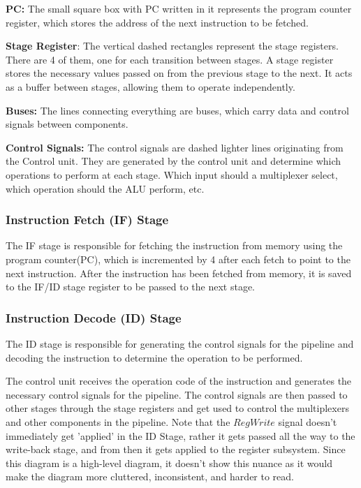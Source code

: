 \textbf{PC:} The small square box with PC written in it represents the program counter register, which stores the address of the next instruction to be fetched. 

\textbf{Stage Register}: The vertical dashed rectangles represent the stage registers. There are 4 of them, one for each transition between stages. A stage register stores the necessary values passed on from the previous stage to the next. It acts as a buffer between stages, allowing them to operate independently.

\textbf{Buses:} The lines connecting everything are buses, which carry data and control signals between components.

\textbf{Control Signals:} The control signals are dashed lighter lines originating from the Control unit. They are generated by the control unit and determine which operations to perform at each stage. Which input should a multiplexer select, which operation should the ALU perform, etc.

\subsubsection{Instruction Fetch (IF) Stage}
The IF stage is responsible for fetching the instruction from memory using the program counter(PC), which is incremented by 4 after each fetch to point to the next instruction. After the instruction has been fetched from memory, it is saved to the IF/ID stage register to be passed to the next stage. 

\subsubsection{Instruction Decode (ID) Stage}
The ID stage is responsible for generating the control signals for the pipeline and decoding the instruction to determine the operation to be performed. 

The control unit receives the operation code of the instruction and generates the necessary control signals for the pipeline. The control signals are then passed to other stages through the stage registers and get used to control the multiplexers and other components in the pipeline. Note that the $RegWrite$ signal doesn't immediately get 'applied' in the ID Stage, rather it gets passed all the way to the write-back stage, and from then it gets applied to the register subsystem. Since this diagram is a high-level diagram, it doesn't show this nuance as it would make the diagram more cluttered, inconsistent, and harder to read.


